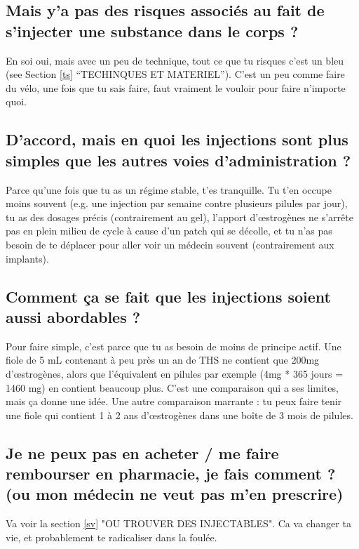 \documentclass{article}
\begin{document}
\subsection{Mais y'a pas des risques associés au fait de s'injecter une substance dans le corps ?}

En soi oui, mais avec un peu de technique, tout ce que tu risques c'est un bleu (see Section \ref{ts} “TECHINQUES ET MATERIEL”). C'est un peu comme faire du vélo, une fois que tu sais faire, faut vraiment le vouloir pour faire n'importe quoi.

\subsection{D'accord, mais en quoi les injections sont plus simples que les autres voies d'administration ?}

Parce qu'une fois que tu as un régime stable, t'es tranquille. Tu t'en occupe moins souvent (e.g. une injection par semaine contre plusieurs pilules par jour), tu as des dosages précis (contrairement au gel), l'apport d'œstrogènes ne s'arrête pas en plein milieu de cycle à cause d'un patch qui se décolle, et tu n'as pas besoin de te déplacer pour aller voir un médecin souvent (contrairement aux implants).

\subsection{Comment ça se fait que les injections soient aussi abordables ?}

Pour faire simple, c'est parce que tu as besoin de moins de principe actif. Une fiole de 5 mL contenant à peu près un an de THS ne contient que 200mg d'œstrogènes, alors que l'équivalent en pilules par exemple (4mg * 365 jours = 1460 mg) en contient beaucoup plus. C'est une comparaison qui a ses limites, mais ça donne une idée. Une autre comparaison marrante : tu peux faire tenir une fiole qui contient 1 à 2 ans d'œstrogènes dans une boîte de 3 mois de pilules.

\subsection{Je ne peux pas en acheter / me faire rembourser en pharmacie, je fais comment ? (ou mon médecin ne veut pas m'en prescrire)}

Va voir la section \ref{sv} "OU TROUVER DES INJECTABLES". Ca va changer ta vie, et probablement te radicaliser dans la foulée.
\end{document}
